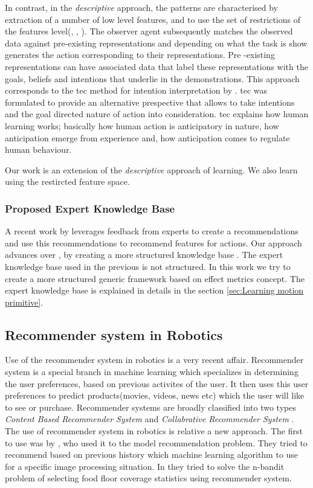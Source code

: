 In contrast, in the  \textit{descriptive} approach, the patterns are characterised by
extraction of a number of low level features, and to use the set of
restrictions of the features level(\cite{isham_introduction_1981}, \cite{jain_deformable_1998}, 
\cite{abdo_learning_2013}). The
observer agent subsequently matches the observed data against pre-existing
representations and depending on what the task is show generates the action
corresponding to their representations. Pre -existing representations can have
associated data that label these representations with the goals, beliefs and
intentions that underlie in the demonstrations. This approach corresponds to the \acrfull{tec}
method for intention interpretation by \cite{csibra_obsessed_2007}. \acrshort{tec} was formulated
to provide an alternative prespective that allows to take intentions and the
goal directed nature of action into consideration. \acrshort{tec} explains how human
learning works; basically how human action is anticipatory in nature, how
anticipation emerge from experience and, how anticipation comes to regulate
human behaviour.

Our work is an extension of the \textit{descriptive} approach of learning. We also learn
using the restircted feature space.

\subsubsection{Proposed Expert Knowledge Base} 
A recent work by \cite{abdo_inferring_2014} leverages feedback from experts to create a
recommendations and use this recommendations to recommend features for actions.
Our approach advances over \cite{abdo_inferring_2014}, by creating  a more structured
knowledge base . The expert knowledge base used in the previous is not
structured. In this work we try to create a more structured generic framework
based on effect metrics concept. The expert knowledge base is explained in 
details in the section \ref{sec:Learning motion primitive}.

\subsection{Recommender system in Robotics}
Use of the recommender system in robotics is a very recent affair. Recommender
system is a special branch in machine learning which specializes in determining
the user preferences, based on previous activites of the user. It then uses
this user preferences to predict products(movies, videos, news etc) which the
user will like to see or purchase. Recommender systems are broadly classified
into two types \textit{Content Based Recommender System} and
\textit{Collabrative Recommender System} \cite{bobadilla_recommender_2013}. The use of recommender system in
robotics is relative a new approach. The first to use was by \cite{matikainen_model_2012},
who used it to the model recommendation problem. They tried to recommend based
on previous history which machine learning algorithm to use for a specific
image processing situation. In \cite{matikainen_multi-armed_2013} they tried to
solve the n-bandit problem of selecting food floor coverage statistics using
recommender system.

